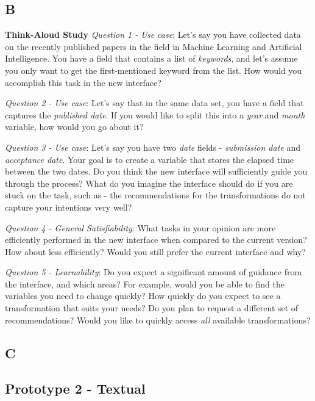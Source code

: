 \documentclass[12pt,letterpaper]{article}
\begin{document}
\subsection*{B}

\textbf{Think-Aloud Study}
\textit{Question 1 - Use case}: Let's say you have collected data on the recently published papers in the field in Machine Learning and Artificial Intelligence. You have a field that contains a list of \textit{keywords}, and let's assume you only want to get the first-mentioned keyword from the list. How would you accomplish this task in the new interface?  

\textit{Question 2 - Use case}: Let's say that in the same data set, you have a field that captures the \textit{published date}. If you would like to split this into a \textit{year} and \textit{month} variable, how would you go about it?

\textit{Question 3 - Use case}: Let's say you have two \textit{date} fields - \textit{submission date} and \textit{acceptance date}. Your goal is to create a variable that stores the elapsed time between the two dates. Do you think the new interface will sufficiently guide you through the process? What do you imagine the interface should do if you are stuck on the task, such as - the recommendations for the transformations do not capture your intentions very well?   

\textit{Question 4 - General Satisfiability}: What tasks in your opinion are more efficiently performed in the new interface when compared to the current version? How about less efficiently? Would you still prefer the current interface and why? 

\textit{Question 5 - Learnability}: Do you expect a significant amount of guidance from the interface, and which areas? For example, would you be able to find the variables you need to change quickly? How quickly do you expect to see a transformation that suits your needs? Do you plan to request a different set of recommendations? Would you like to quickly access \textit{all} available transformations? 

\subsection*{C}

\subsection*{Prototype 2 - Textual}
\end{document}
